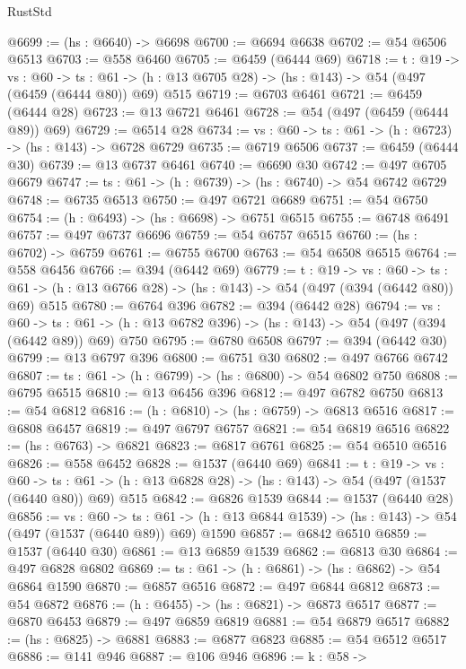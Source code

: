 \begin{lexlean}{RustStd}
\begin{coremodule}
@6699 := (hs : @6640) -> @6698
@6700 := @6694 @6638
@6702 := @54 @6506 @6513
@6703 := @558 @6460
@6705 := @6459 (@6444 @69)
@6718 := {t : @19} ->
  {vs : @60} ->
  {ts : @61} -> (h : @13 @6705 @28) -> (hs : @143) -> @54 (@497 (@6459 (@6444 @80)) @69) @515
@6719 := @6703 @6461
@6721 := @6459 (@6444 @28)
@6723 := @13 @6721 @6461
@6728 := @54 (@497 (@6459 (@6444 @89)) @69)
@6729 := @6514 @28
@6734 := {vs : @60} -> {ts : @61} -> (h : @6723) -> (hs : @143) -> @6728 @6729
@6735 := @6719 @6506
@6737 := @6459 (@6444 @30)
@6739 := @13 @6737 @6461
@6740 := @6690 @30
@6742 := @497 @6705 @6679
@6747 := {ts : @61} -> (h : @6739) -> (hs : @6740) -> @54 @6742 @6729
@6748 := @6735 @6513
@6750 := @497 @6721 @6689
@6751 := @54 @6750
@6754 := (h : @6493) -> (hs : @6698) -> @6751 @6515
@6755 := @6748 @6491
@6757 := @497 @6737 @6696
@6759 := @54 @6757 @6515
@6760 := (hs : @6702) -> @6759
@6761 := @6755 @6700
@6763 := @54 @6508 @6515
@6764 := @558 @6456
@6766 := @394 (@6442 @69)
@6779 := {t : @19} ->
  {vs : @60} ->
  {ts : @61} -> (h : @13 @6766 @28) -> (hs : @143) -> @54 (@497 (@394 (@6442 @80)) @69) @515
@6780 := @6764 @396
@6782 := @394 (@6442 @28)
@6794 := {vs : @60} ->
  {ts : @61} -> (h : @13 @6782 @396) -> (hs : @143) -> @54 (@497 (@394 (@6442 @89)) @69) @750
@6795 := @6780 @6508
@6797 := @394 (@6442 @30)
@6799 := @13 @6797 @396
@6800 := @6751 @30
@6802 := @497 @6766 @6742
@6807 := {ts : @61} -> (h : @6799) -> (hs : @6800) -> @54 @6802 @750
@6808 := @6795 @6515
@6810 := @13 @6456 @396
@6812 := @497 @6782 @6750
@6813 := @54 @6812
@6816 := (h : @6810) -> (hs : @6759) -> @6813 @6516
@6817 := @6808 @6457
@6819 := @497 @6797 @6757
@6821 := @54 @6819 @6516
@6822 := (hs : @6763) -> @6821
@6823 := @6817 @6761
@6825 := @54 @6510 @6516
@6826 := @558 @6452
@6828 := @1537 (@6440 @69)
@6841 := {t : @19} ->
  {vs : @60} ->
  {ts : @61} -> (h : @13 @6828 @28) -> (hs : @143) -> @54 (@497 (@1537 (@6440 @80)) @69) @515
@6842 := @6826 @1539
@6844 := @1537 (@6440 @28)
@6856 := {vs : @60} ->
  {ts : @61} -> (h : @13 @6844 @1539) -> (hs : @143) -> @54 (@497 (@1537 (@6440 @89)) @69) @1590
@6857 := @6842 @6510
@6859 := @1537 (@6440 @30)
@6861 := @13 @6859 @1539
@6862 := @6813 @30
@6864 := @497 @6828 @6802
@6869 := {ts : @61} -> (h : @6861) -> (hs : @6862) -> @54 @6864 @1590
@6870 := @6857 @6516
@6872 := @497 @6844 @6812
@6873 := @54 @6872
@6876 := (h : @6455) -> (hs : @6821) -> @6873 @6517
@6877 := @6870 @6453
@6879 := @497 @6859 @6819
@6881 := @54 @6879 @6517
@6882 := (hs : @6825) -> @6881
@6883 := @6877 @6823
@6885 := @54 @6512 @6517
@6886 := @141 @946
@6887 := @106 @946
@6896 := {k : @58} ->

\end{coremodule}
\end{lexlean}
